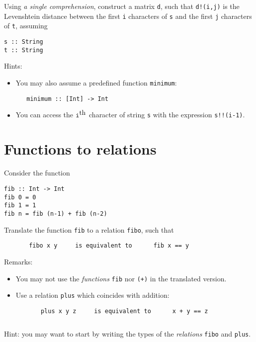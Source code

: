 \documentclass{article}
\begin{document}
Using \emph{a single comprehension}, construct a matrix \texttt{d},
such that \texttt{d!(i,j)} is the Levenshtein distance between the
first \texttt{i} characters of \texttt{s} and the first \texttt{j}
characters of \texttt{t}, assuming
\begin{verbatim}
s :: String
t :: String
\end{verbatim}

Hints:
\begin{itemize}
\item You may also assume a predefined function \texttt{minimum}:
\begin{verbatim}
   minimum :: [Int] -> Int
\end{verbatim}
\item You can access the $\mbox{\texttt{i}}^{\mbox{th}}$ character of
  string \texttt{s} with the expression \texttt{s!!(i-1)}.
\end{itemize}

\newpage
\section{Functions to relations}

Consider the function
\begin{verbatim}
fib :: Int -> Int
fib 0 = 0
fib 1 = 1
fib n = fib (n-1) + fib (n-2)
\end{verbatim}

Translate the function \texttt{fib} to a relation \texttt{fibo}, such that
\begin{verbatim}
       fibo x y     is equivalent to      fib x == y
\end{verbatim}

Remarks:
\begin{itemize}
\item You may not use the \emph{functions} \texttt{fib} nor \texttt{(+)} in the
  translated version.
\item Use a relation \texttt{plus} which coincides with addition:
  \begin{verbatim}
       plus x y z     is equivalent to      x + y == z
\end{verbatim}

\begin{verbatim}

\end{verbatim}
\end{itemize}

Hint: you may want to start by writing the types of the
\emph{relations} \texttt{fibo} and \texttt{plus}.
\end{document}
